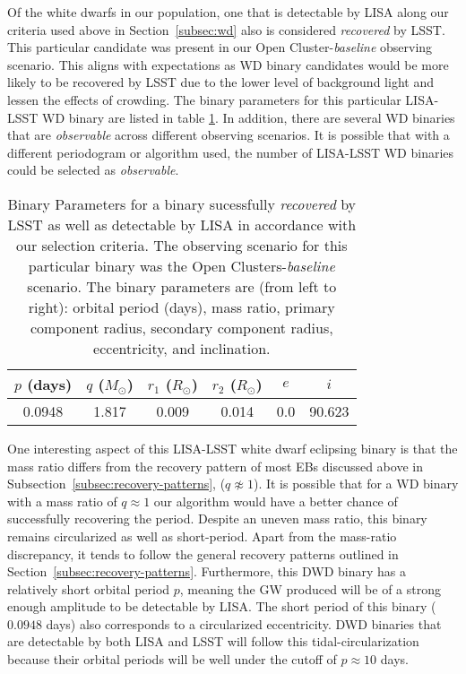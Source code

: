 \documentclass[twocolumn]{aastex63}
\begin{document}
Of the white dwarfs in our population, one that is detectable by LISA along our criteria used above in Section~\ref{subsec:wd} also is considered \textit{recovered} by LSST. This particular candidate was present in our Open Cluster-\textit{baseline} observing scenario. This aligns with expectations as WD binary candidates would be more likely to be recovered by LSST due to the lower level of background light and lessen the effects of crowding. The binary parameters for this particular LISA-LSST WD binary are listed in table \ref{tab:lsst-lisa binary}. In addition, there are several WD binaries that are \textit{observable} across different observing scenarios. It is possible that with a different periodogram or algorithm used, the number of LISA-LSST WD binaries could be selected as \textit{observable}.

\begin{table}[t]
    \centering
    \begin{tabular}{c|c|c|c|c|c}
        $p$ (days) & $q$ ($M_{\odot}$) & $r_1$ ($R_{\odot}$) & $r_2$ ($R_{\odot}$) & $e$ & $i$ \\
        \hline
        0.0948 & 1.817 & 0.009 & 0.014 & 0.0 & 90.623 \\
    \end{tabular}
    \caption{Binary Parameters for a binary sucessfully \textit{recovered} by LSST as well as detectable by LISA in accordance with our selection criteria. The observing scenario for this particular binary was the Open Clusters-\textit{baseline} scenario. The binary parameters are (from left to right): orbital period (days), mass ratio, primary component radius, secondary component radius, eccentricity, and inclination.}
    \label{tab:lsst-lisa binary}
\end{table}

One interesting aspect of this LISA-LSST white dwarf eclipsing binary is that the mass ratio differs from the recovery pattern of most EBs discussed above in Subsection~\ref{subsec:recovery-patterns}, ($q \not\approx 1$). It is possible that for a WD binary with a mass ratio of $q \approx 1$  our algorithm would have a better chance of successfully recovering the period. Despite an uneven mass ratio, this binary remains circularized as well as short-period. Apart from the mass-ratio discrepancy, it tends to follow the general recovery patterns outlined in Section~\ref{subsec:recovery-patterns}. Furthermore, this DWD binary has a relatively short orbital period $p$, meaning the GW produced will be of a strong enough amplitude to be detectable by LISA. The short period of this binary ($0.0948$ days) also corresponds to a circularized eccentricity. DWD binaries that are detectable by both LISA and LSST will follow this tidal-circularization because their orbital periods will be well under the cutoff of $p \approx 10$ days.
\end{document}
